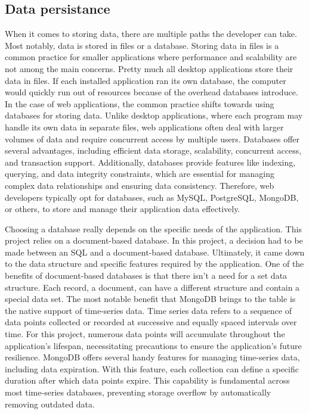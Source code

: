 \documentclass[FM,BP,EN,fonts]{tulthesis}
\begin{document}
\subsection{Data persistance}
When it comes to storing data, there are multiple paths the developer can take. Most notably, data is stored in files or a database. Storing data in files is a common practice for smaller applications where performance and scalability are not among the main concerns. Pretty much all desktop applications store their data in files. If each installed application ran its own database, the computer would quickly run out of resources because of the overhead databases introduce. In the case of web applications, the common practice shifts towards using databases for storing data. Unlike desktop applications, where each program may handle its own data in separate files, web applications often deal with larger volumes of data and require concurrent access by multiple users. Databases offer several advantages, including efficient data storage, scalability, concurrent access, and transaction support. Additionally, databases provide features like indexing, querying, and data integrity constraints, which are essential for managing complex data relationships and ensuring data consistency. Therefore, web developers typically opt for databases, such as MySQL, PostgreSQL, MongoDB, or others, to store and manage their application data effectively.

Choosing a database really depends on the specific needs of the application. This project relies on a document-based database. In this project, a decision had to be made between an SQL and a document-based database. Ultimately, it came down to the data structure and specific features required by the application. One of the benefits of document-based databases is that there isn't a need for a set data structure. Each record, a document, can have a different structure and contain a special data set. The most notable benefit that MongoDB brings to the table is the native support of time-series data. Time series data refers to a sequence of data points collected or recorded at successive and equally spaced intervals over time. For this project, numerous data points will accumulate throughout the application's lifespan, necessitating precautions to ensure the application's future resilience. MongoDB offers several handy features for managing time-series data, including data expiration. With this feature, each collection can define a specific duration after which data points expire. This capability is fundamental across most time-series databases, preventing storage overflow by automatically removing outdated data.
\end{document}
